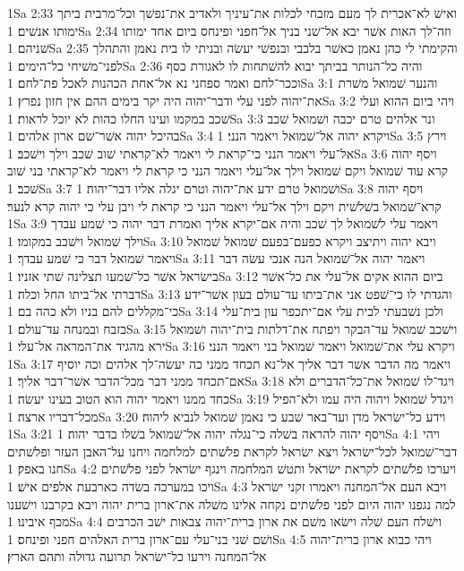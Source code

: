1Sa 2:33  ואישׁ לא־אכרית לך מעם מזבחי לכלות את־עיניך ולאדיב את־נפשׁך וכל־מרבית ביתך ימותו אנשׁים׃
1Sa 2:34  וזה־לך האות אשׁר יבא אל־שׁני בניך אל־חפני ופינחס ביום אחד ימותו שׁניהם׃
1Sa 2:35  והקימתי לי כהן נאמן כאשׁר בלבבי ובנפשׁי יעשׂה ובניתי לו בית נאמן והתהלך לפני־משׁיחי כל־הימים׃
1Sa 2:36  והיה כל־הנותר בביתך יבוא להשׁתחות לו לאגורת כסף וככר־לחם ואמר ספחני נא אל־אחת הכהנות לאכל פת־לחם׃
1Sa 3:1  והנער שׁמואל משׁרת את־יהוה לפני עלי ודבר־יהוה היה יקר בימים ההם אין חזון נפרץ׃
1Sa 3:2  ויהי ביום ההוא ועלי שׁכב במקמו ועינו החלו כהות לא יוכל לראות׃
1Sa 3:3  ונר אלהים טרם יכבה ושׁמואל שׁכב בהיכל יהוה אשׁר־שׁם ארון אלהים׃
1Sa 3:4  ויקרא יהוה אל־שׁמואל ויאמר הנני׃
1Sa 3:5  וירץ אל־עלי ויאמר הנני כי־קראת לי ויאמר לא־קראתי שׁוב שׁכב וילך וישׁכב׃
1Sa 3:6  ויסף יהוה קרא עוד שׁמואל ויקם שׁמואל וילך אל־עלי ויאמר הנני כי קראת לי ויאמר לא־קראתי בני שׁוב שׁכב׃
1Sa 3:7  ושׁמואל טרם ידע את־יהוה וטרם יגלה אליו דבר־יהוה׃
1Sa 3:8  ויסף יהוה קרא־שׁמואל בשׁלשׁית ויקם וילך אל־עלי ויאמר הנני כי קראת לי ויבן עלי כי יהוה קרא לנער׃
1Sa 3:9  ויאמר עלי לשׁמואל לך שׁכב והיה אם־יקרא אליך ואמרת דבר יהוה כי שׁמע עבדך וילך שׁמואל וישׁכב במקומו׃
1Sa 3:10  ויבא יהוה ויתיצב ויקרא כפעם־בפעם שׁמואל שׁמואל ויאמר שׁמואל דבר כי שׁמע עבדך׃
1Sa 3:11  ויאמר יהוה אל־שׁמואל הנה אנכי עשׂה דבר בישׂראל אשׁר כל־שׁמעו תצלינה שׁתי אזניו׃
1Sa 3:12  ביום ההוא אקים אל־עלי את כל־אשׁר דברתי אל־ביתו החל וכלה׃
1Sa 3:13  והגדתי לו כי־שׁפט אני את־ביתו עד־עולם בעון אשׁר־ידע כי־מקללים להם בניו ולא כהה בם׃
1Sa 3:14  ולכן נשׁבעתי לבית עלי אם־יתכפר עון בית־עלי בזבח ובמנחה עד־עולם׃
1Sa 3:15  וישׁכב שׁמואל עד־הבקר ויפתח את־דלתות בית־יהוה ושׁמואל ירא מהגיד את־המראה אל־עלי׃
1Sa 3:16  ויקרא עלי את־שׁמואל ויאמר שׁמואל בני ויאמר הנני׃
1Sa 3:17  ויאמר מה הדבר אשׁר דבר אליך אל־נא תכחד ממני כה יעשׂה־לך אלהים וכה יוסיף אם־תכחד ממני דבר מכל־הדבר אשׁר־דבר אליך׃
1Sa 3:18  ויגד־לו שׁמואל את־כל־הדברים ולא כחד ממנו ויאמר יהוה הוא הטוב בעינו יעשׂה׃
1Sa 3:19  ויגדל שׁמואל ויהוה היה עמו ולא־הפיל מכל־דבריו ארצה׃
1Sa 3:20  וידע כל־ישׂראל מדן ועד־באר שׁבע כי נאמן שׁמואל לנביא ליהוה׃
1Sa 3:21  ויסף יהוה להראה בשׁלה כי־נגלה יהוה אל־שׁמואל בשׁלו בדבר יהוה׃
1Sa 4:1  ויהי דבר־שׁמואל לכל־ישׂראל ויצא ישׂראל לקראת פלשׁתים למלחמה ויחנו על־האבן העזר ופלשׁתים חנו באפק׃
1Sa 4:2  ויערכו פלשׁתים לקראת ישׂראל ותטשׁ המלחמה וינגף ישׂראל לפני פלשׁתים ויכו במערכה בשׂדה כארבעת אלפים אישׁ׃
1Sa 4:3  ויבא העם אל־המחנה ויאמרו זקני ישׂראל למה נגפנו יהוה היום לפני פלשׁתים נקחה אלינו משׁלה את־ארון ברית יהוה ויבא בקרבנו וישׁענו מכף איבינו׃
1Sa 4:4  וישׁלח העם שׁלה וישׂאו משׁם את ארון ברית־יהוה צבאות ישׁב הכרבים ושׁם שׁני בני־עלי עם־ארון ברית האלהים חפני ופינחס׃
1Sa 4:5  ויהי כבוא ארון ברית־יהוה אל־המחנה וירעו כל־ישׂראל תרועה גדולה ותהם הארץ׃
